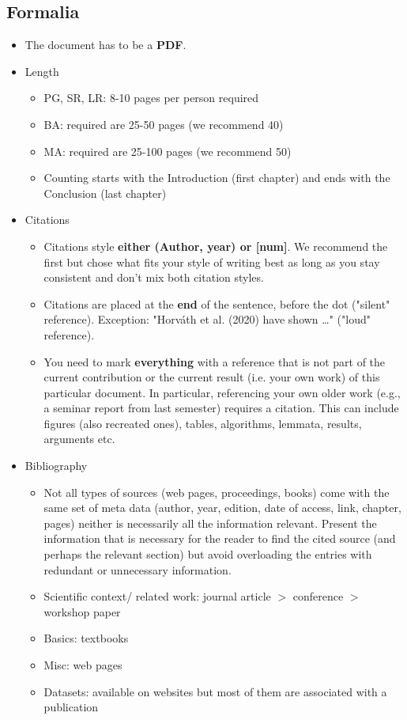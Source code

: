 \documentclass[nodate]{proc}
\begin{document}
\subsection{Formalia}
\begin{itemize}

	\item The document has to be a \textbf{PDF}.

	\item Length
	\begin{itemize}
		\item PG, SR, LR: 8-10 pages per person required
		\item BA: required are 25-50 pages (we recommend 40)
		\item MA: required are 25-100 pages (we recommend 50)
		\item Counting starts with the Introduction (first chapter) and ends with the Conclusion (last chapter)
	\end{itemize}

	\item Citations
	\begin{itemize}
		\item Citations style \textbf{either (Author, year) or [num]}. We recommend the first but chose what fits your style of writing best as long as you stay consistent and don't mix both citation styles.
		\item Citations are placed at the \textbf{end} of the sentence, before the dot ("silent" reference). Exception: "Horv\'ath et al. (2020) have shown \dots" ("loud" reference).
		\item You need to mark \textbf{everything} with a reference that is not part of the current contribution or the current result (i.e. your own work) of this particular document. In particular, referencing your own older work (e.g., a seminar report from last semester) requires a citation. This can include figures (also recreated ones), tables, algorithms, lemmata, results, arguments etc.
	\end{itemize}

	\item Bibliography \label{general_bib}
	\begin{itemize}
		\item Not all types of sources (web pages, proceedings, books) come with the same set of meta data (author, year, edition, date of access, link, chapter, pages) neither is necessarily all the information relevant. Present the information that is necessary for the reader to find the cited source (and perhaps the relevant section) but avoid overloading the entries with redundant or unnecessary information.
		\item Scientific context/ related work: journal article $>$ conference $>$ workshop paper
		\item Basics: textbooks
		\item Misc: web pages
		\item Datasets: available on websites but most of them are associated with a publication 
	\end{itemize}

\end{itemize}
\end{document}
